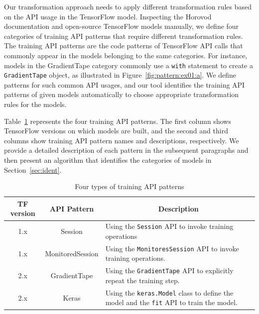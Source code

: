 Our transformation approach needs to apply different transformation rules based
on the API usage in the TensorFlow model. 
Inspecting the Horovod documentation and open-source TensorFlow models
manually, we define four categories of training API patterns that require
different transformation rules. 
The training API patterns are the code patterns of TensorFlow API calls that
commonly appear in the models belonging to the same categories.
For instance, models in the {GradientTape} category commonly use a {\tt with}
statement to create a {\tt GradientTape} object, as illustrated in
Figure~\ref{fig:pattern:ex01:a}.
We define patterns for such common API usages, and our tool identifies the
training API patterns of given models automatically to choose appropriate
transformation rules for the models.

Table~\ref{tab:patterns} represents the four training API patterns. 
The first column shows TensorFlow versions on which models are built, and the
second and third columns show training API pattern names and descriptions,
respectively.
We provide a detailed description of each pattern in the subsequent paragraphs
and then present an algorithm that identifies the categories of models in
Section~\ref{sec:ident}.


\begin{table}[ht!]
  \centering
  \caption{Four types of training API patterns}
  \begin{tabularx}{\textwidth}{|c|c|X|}
    \hline
    TF version & API Pattern & \multicolumn{1}{c|}{Description} \\
    \hline
    1.x & Session & 
	  Using the {\tt Session} API to invoke training operations\\
    \hline
    1.x & MonitoredSession & 
      Using the {\tt MonitoresSession} API to invoke training operations.\\
    \hline
    2.x & GradientTape & 
      Using the {\tt GradientTape} API to explicitly repeat the training
      step.\\
    \hline
    2.x & Keras & 
      Using the {\tt keras.Model} class to define the model and the {\tt fit} API
      to train the model.\\
    \hline
  \end{tabularx}
  \label{tab:patterns}
\end{table}

